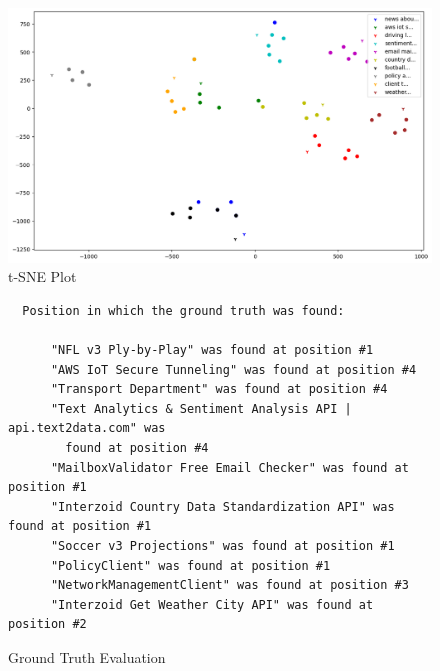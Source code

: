 \begin{figure}[!h]
    \centering
    \includegraphics[width=13cm]{assets/png/experimentation/sne}
    \caption{t-SNE Plot}
    \label{fig:tSNE-plot}
\end{figure}

\begin{figure}[!h]
    \begin{verbatim}
  Position in which the ground truth was found:

      "NFL v3 Ply-by-Play" was found at position #1
      "AWS IoT Secure Tunneling" was found at position #4
      "Transport Department" was found at position #4
      "Text Analytics & Sentiment Analysis API | api.text2data.com" was
        found at position #4
      "MailboxValidator Free Email Checker" was found at position #1
      "Interzoid Country Data Standardization API" was found at position #1
      "Soccer v3 Projections" was found at position #1
      "PolicyClient" was found at position #1
      "NetworkManagementClient" was found at position #3
      "Interzoid Get Weather City API" was found at position #2
    \end{verbatim}
    \caption{Ground Truth Evaluation}
    \label{fig:ground-truth-eval}
\end{figure}

